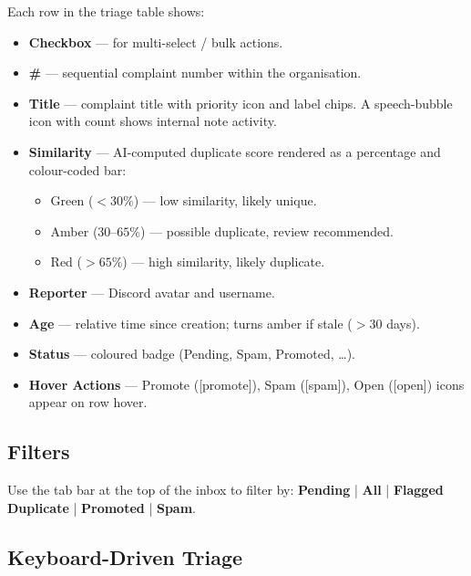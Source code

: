 \documentclass[12pt,a4paper]{report}
\begin{document}
Each row in the triage table shows:
\begin{itemize}
  \item \textbf{Checkbox} --- for multi-select / bulk actions.
  \item \textbf{\#} --- sequential complaint number within the organisation.
  \item \textbf{Title} --- complaint title with priority icon and label chips.
    A speech-bubble icon with count shows internal note activity.
  \item \textbf{Similarity} --- AI-computed duplicate score rendered as a
    percentage and colour-coded bar:
    \begin{itemize}
      \item \textcolor{success!80!black}{Green ($< 30\%$)} --- low similarity, likely unique.
      \item \textcolor{warning!80!black}{Amber ($30$--$65\%$)} --- possible duplicate, review recommended.
      \item \textcolor{danger!80!black}{Red ($> 65\%$)} --- high similarity, likely duplicate.
    \end{itemize}
  \item \textbf{Reporter} --- Discord avatar and username.
  \item \textbf{Age} --- relative time since creation; turns amber if stale
    ($> 30$ days).
  \item \textbf{Status} --- coloured badge (Pending, Spam, Promoted, \ldots).
  \item \textbf{Hover Actions} --- Promote ([promote]), Spam ([spam]),
    Open ([open]) icons appear on row hover.
\end{itemize}

\subsection{Filters}

Use the tab bar at the top of the inbox to filter by:
\textbf{Pending} | \textbf{All} | \textbf{Flagged Duplicate} |
\textbf{Promoted} | \textbf{Spam}.

\subsection{Keyboard-Driven Triage}
\end{document}
